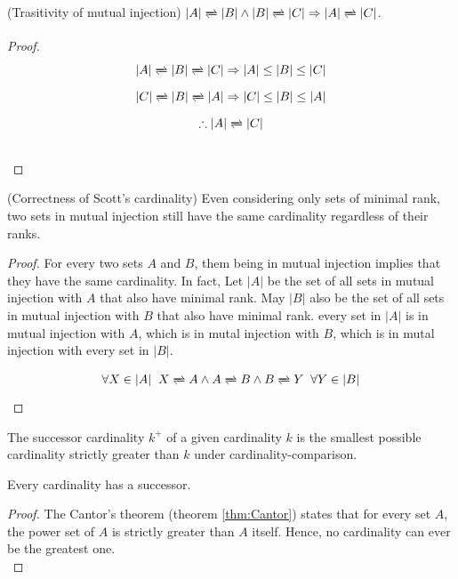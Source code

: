 \begin{lemma}(Trasitivity of mutual injection) 
    $|A| \darr |B| \land |B| \darr |C| \Rightarrow |A| \darr |C|$.
\end{lemma}
\begin{proof}
    $$ |A| \darr |B| \darr |C| \Rightarrow |A| \leq |B| \leq |C| $$
    $$ |C| \darr |B| \darr |A| \Rightarrow |C| \leq |B| \leq |A| $$
    $$ \therefore |A| \darr |C| $$ \\
\end{proof} 

\begin{lemma}(Correctness of Scott's cardinality) 
    Even considering only sets of minimal rank, two sets in mutual injection
    still have the same cardinality regardless of their ranks.
\end{lemma}
\begin{proof}
    For every two sets $A$ and $B$, them being in mutual injection implies that they have the 
    same cardinality. In fact, Let $|A|$ be the set of all sets in mutual injection with 
    $A$ that also have minimal rank. May $|B|$ also be the set of all sets in mutual
    injection with $B$ that also have minimal rank. every set in $|A|$ is in mutual injection with 
    $A$, which is in mutal injection with $B$, which is in mutal injection with every set in $|B|$.

    $$ \forall X \in |A|\;\; X \darr A \land A \darr B \land B \darr Y \;\;\forall Y \in |B|$$
\end{proof}

\begin{definition}
    The successor cardinality $k^{+}$ of a given cardinality $k$ is 
    the smallest possible cardinality strictly greater than $k$ under cardinality-comparison. 
\end{definition}

\begin{lemma}
    Every cardinality has a successor.
\end{lemma}
\begin{proof}
    The Cantor's theorem (theorem \ref{thm:Cantor}) states that for every set $A$, 
    the power set of $A$ is strictly greater than $A$ itself. Hence, no cardinality 
    can ever be the greatest one. \\
\end{proof}